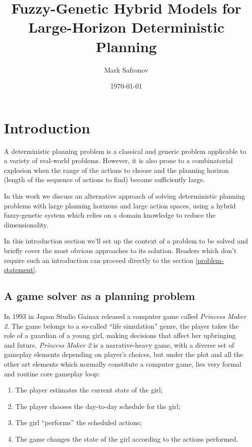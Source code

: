 \documentclass[12pt, a4paper]{article}
\title{Fuzzy-Genetic Hybrid Models for Large-Horizon Deterministic Planning}
\author{Mark Safronov}
\date{\today}
\begin{document}
	
	
	
	\tableofcontents
	
	\section{Introduction}
	
	A deterministic planning problem is a classical and generic problem applicable to a variety of real-world problems.
	However, it is also prone to a combinatorial explosion when the range of the actions to choose and the planning horizon (length of the sequence of actions to find) become sufficiently large.
	
	In this work we discuss an alternative approach of solving deterministic planning problems with large planning horizons and large action spaces, using a hybrid fuzzy-genetic system which relies on a domain knowledge to reduce the dimensionality.
	
	In this introduction section we'll set up the context of a problem to be solved and briefly cover the most obvious approaches to its solution.
	Readers which don't require such an introduction can proceed directly to the section \ref{problem-statement}.
	
	\subsection{A game solver as a planning problem}

	In 1993 in Japan Studio Gainax released a computer game called \textit{Princess Maker 2}.
	The game belongs to a so-called ``life simulation'' genre, the player takes the role of a guardian of a young girl, making decisions that affect her upbringing and future.
	\textit{Princess Maker 2} is a narrative-heavy game, with a diverse set of gameplay elements depending on player's choices, but under the plot and all the other art elements which normally constitute a computer game, lies very formal and routine core gameplay loop:
	
	\begin{enumerate}
		\item The player estimates the current state of the girl;
		\item The player chooses the day-to-day schedule for the girl;
		\item The girl ``performs'' the scheduled actions;
		\item The game changes the state of the girl according to the actions performed.
	\end{enumerate}
	
\end{document}
